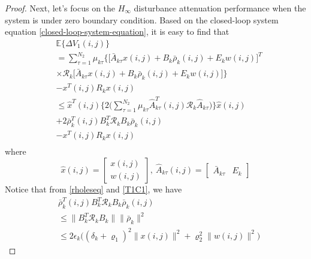 \documentclass[journal,final,twocolumn]{IEEEtran}
\begin{document}
\begin{proof}
	Next, let's focus on the $H_{\infty}$  disturbance attenuation performance when the system is under zero boundary condition. Based on the closed-loop system equation \eqref{closed-loop-system-equation}, it is easy to find that
	\begin{equation}\label{DETAV1}
	\begin{split}
	&\mathbb{E}\{\varDelta V_{1}(i,j) \}\\
	&=  \sum_{\tau =1}^{N_{2}}\mu_{k\tau }\Big\{\big[\bar{A}_{k\tau }x(i,j)+B_{k}\bar{\rho}_{k}(i,j)+E_{k}w(i,j)\big]^{T}\\
	&\times \mathcal{R}_{k}\big[\bar{A}_{k\tau }x(i,j)+B_{k}\bar{\rho}_{k}(i,j)+E_{k}w(i,j)\big]\Big\}\\
	&- x^{T}(i,j)R_{k}x(i,j) \\
	&\leq \hat{x}^{T}(i,j) \Big\{2\big(\sum_{\tau =1}^{N_{2}}\mu_{k\tau }\hat{A}^{T}_{k\tau }(i,j)\mathcal{R}_{k}\hat{A}_{k\tau }\big)\Big\}\hat{x}(i,j)\\ &+2\bar{\rho}^{T}_{k}(i,j)B^{T}_{k}\mathcal{R}_{k}B_{k}\bar{\rho}_{k}(i,j) \\
	&-  x^{T}(i,j)R_{k}x(i,j)\\
	\end{split}
	\end{equation}
	where
	\begin{equation*}
		\hat{x}(i,j)=\begin{bmatrix}
		x(i,j)\\ w(i,j)
		\end{bmatrix},\ \hat{A}_{k\tau }(i,j)=\begin{bmatrix}
		\bar{A}_{k\tau }&E_{k}
		\end{bmatrix}
	\end{equation*}
	Notice that from \eqref{rholeseq} and \eqref{T1C1}, we have
	\begin{equation}\label{invRho}
		\begin{split}
		 	&\bar{\rho}^{T}_{k}(i,j)B^{T}_{k}\mathcal{R}_{k}B_{k}\bar{\rho}_{k}(i,j)\\
		 	&\leq \|B^{T}_{k}\mathcal{R}_{k}B_{k}\|\|\bar{\rho}_{k}\|^{2} \\
		 	&\leq 2\epsilon_{k}\big((\delta_{k}+\varrho_{1})^{2}\|x(i,j)\|^{2}+\varrho_{2}^{2}\|w(i,j)\|^{2} \big)

\end{split}
\end{equation}
\end{proof}
\end{document}
